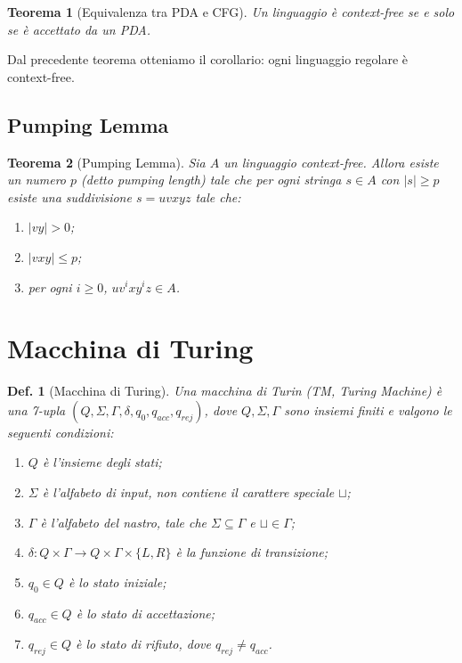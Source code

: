 \documentclass[11pt]{article}
\newtheorem{definition}{Def.}[section]
\newtheorem{theorem}{Teorema}[section]
\begin{document}
\begin{theorem}[Equivalenza tra PDA e CFG]
	Un linguaggio è context-free se e solo se è accettato da un PDA.
\end{theorem}

Dal precedente teorema otteniamo il corollario: ogni linguaggio regolare è
context-free.

\subsection{Pumping Lemma}

\begin{theorem}[Pumping Lemma]
	Sia $A$ un linguaggio context-free. Allora esiste un numero $p$ (detto
	pumping length) tale che per ogni stringa $s \in A$ con $|s| \geq p$ esiste
	una suddivisione $s = uvxyz$ tale che:
	\begin{enumerate}
		\item $|vy| > 0$;
		\item $|vxy| \leq p$;
		\item per ogni $i \geq 0$, $uv^ixy^iz \in A$.
	\end{enumerate}
\end{theorem}

\section{Macchina di Turing}

\begin{definition}[Macchina di Turing]
	Una macchina di Turin (TM, Turing Machine) è una 7-upla $(Q, \Sigma, \Gamma,
	\delta, q_0, q_{acc}, q_{rej})$, dove $Q, \Sigma, \Gamma$ sono insiemi 
	finiti e valgono le seguenti condizioni:
	\begin{enumerate}
		\item $Q$ è l'insieme degli stati;
		\item $\Sigma$ è l'alfabeto di input, non contiene il carattere
			speciale $\sqcup$;
		\item $\Gamma$ è l'alfabeto del nastro, tale che $\Sigma \subseteq
			\Gamma$ e $\sqcup \in \Gamma$;
		\item $\delta : Q \times \Gamma \rightarrow Q \times \Gamma \times
			\{L, R\}$ è la funzione di transizione;
		\item $q_0 \in Q$ è lo stato iniziale;
		\item $q_{acc} \in Q$ è lo stato di accettazione;
		\item $q_{rej} \in Q$ è lo stato di rifiuto, dove $q_{rej} \neq
			q_{acc}$.
	\end{enumerate}
\end{definition}
\end{document}
